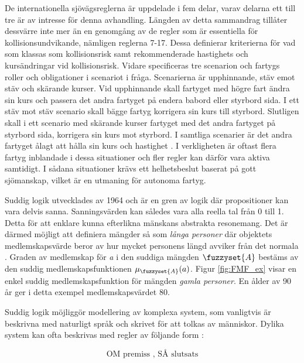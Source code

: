 De internationella sjövägsreglerna är uppdelade i fem delar, varav delarna ett till tre är av intresse för denna avhandling. Längden av detta sammandrag tillåter dessvärre inte mer än en genomgång av de regler som är essentiella för kollisionsundvikande, nämligen reglerna 7-17. Dessa definierar kriterierna för vad som klassas som kollisionsrisk samt rekommenderade hastighets och kursändringar vid kollisionsrisk. Vidare specificeras tre scenarion och fartygs roller och obligationer i scenariot i fråga. Scenarierna är upphinnande, stäv emot stäv och skärande kurser. Vid upphinnande skall fartyget med högre fart ändra sin kurs och passera det andra fartyget på endera babord eller styrbord sida. I ett stäv mot stäv scenario skall bägge fartyg korrigera sin kurs till styrbord. Slutligen skall i ett scenario med skärande kurser fartyget med det andra fartyget på styrbord sida, korrigera sin kurs mot styrbord. I samtliga scenarier är det andra fartyget ålagt att hålla sin kurs och hastighet \cite{colreg}. I verkligheten är oftast flera fartyg inblandade i dessa situationer och fler regler kan därför vara aktiva samtidigt. I sådana situationer krävs ett helhetsbeslut baserat på gott sjömanskap, vilket är en utmaning för autonoma fartyg.


Suddig logik utvecklades av \textcite{zadeh1996fuzzy} 1964 och är en gren av logik där propositioner kan vara delvis sanna. Sanningsvärden kan således vara alla reella tal från 0 till 1. Detta för att  enklare kunna efterlikna mänskans abstrakta resonemang.  Det är därmed möjligt att definiera mängder så som  \textit{långa personer}  där objektets medlemskapsvärde beror av hur mycket personens längd avviker från det normala \cite{chen2000introduction}.  Graden av medlemskap för \textit{a} i den suddiga mängden $\fuzzyset{A}$ bestäms av den suddig medlemskapsfunktionen $\mu_{\fuzzyset{A}}(a)$.   Figur \ref{fig:FMF_ex} visar en enkel suddig medlemskapsfunktion för mängden \textit{gamla personer}. En ålder av 90 år ger i detta exempel medlemskapsvärdet 80.

Suddig logik möjliggör  modellering av komplexa system, som vanligtvis är beskrivna med naturligt språk och skrivet för att tolkas av människor. Dylika system kan ofta beskrivas med regler av följande form :

\begin{equation}
    \text{OM premiss , SÅ slutsats}
\end{equation}



